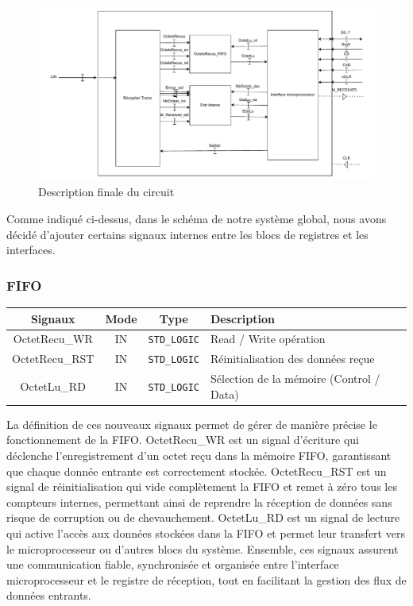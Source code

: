 \begin{figure}[H]
    \centering
    \includegraphics[width=0.8\linewidth]{images/inter/Schema_Final.pdf}
    \caption{Description finale du circuit}
    \label{fig:placeholder}
\end{figure}

Comme indiqué ci-dessus, dans le schéma de notre système global, nous avons décidé d’ajouter certains signaux internes entre les blocs de registres et les interfaces.
\newline

\subsubsection*{FIFO}

\begin{center}
\renewcommand{\arraystretch}{1.2} %
\small %
    \begin{tabularx}{\textwidth}{|c||c|c|X|}
     \hline			
       \textbf{Signaux} & \textbf{Mode} & \textbf{Type} & \textbf{Description}  \\ \hline 
       OctetRecu\_WR & IN & \texttt{STD\_LOGIC} & Read / Write opération \\
       OctetRecu\_RST & IN & \texttt{STD\_LOGIC} & Réinitialisation des données reçue \\
       OctetLu\_RD & IN & \texttt{STD\_LOGIC} & Sélection de la mémoire (Control / Data) \\
     \hline  
    \end{tabularx}
\end{center}

La définition de ces nouveaux signaux permet de gérer de manière précise le fonctionnement de la FIFO. OctetRecu\_WR est un signal d’écriture qui déclenche l’enregistrement d’un octet reçu dans la mémoire FIFO, garantissant que chaque donnée entrante est correctement stockée. OctetRecu\_RST est un signal de réinitialisation qui vide complètement la FIFO et remet à zéro tous les compteurs internes, permettant ainsi de reprendre la réception de données sans risque de corruption ou de chevauchement. OctetLu\_RD est un signal de lecture qui active l’accès aux données stockées dans la FIFO et permet leur transfert vers le microprocesseur ou d’autres blocs du système. Ensemble, ces signaux assurent une communication fiable, synchronisée et organisée entre l’interface microprocesseur et le registre de réception, tout en facilitant la gestion des flux de données entrants.
\newline

